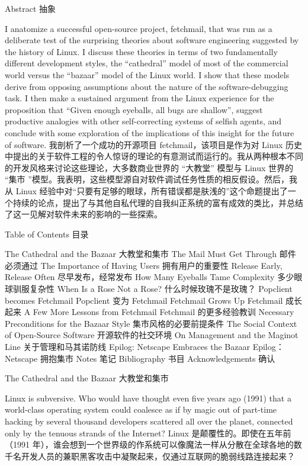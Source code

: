 \documentclass[a4paper,12pt,UTF8,twoside]{ctexbook}
\begin{document}
Abstract  抽象

I anatomize a successful open-source project, fetchmail, that was run as a deliberate test of the surprising theories about software engineering suggested by the history of Linux. I discuss these theories in terms of two fundamentally different development styles, the ``cathedral'' model of most of the commercial world versus the ``bazaar'' model of the Linux world. I show that these models derive from opposing assumptions about the nature of the software-debugging task. I then make a sustained argument from the Linux experience for the proposition that ``Given enough eyeballs, all bugs are shallow'', suggest productive analogies with other self-correcting systems of selfish agents, and conclude with some exploration of the implications of this insight for the future of software.
我剖析了一个成功的开源项目 fetchmail，该项目是作为对 Linux 历史中提出的关于软件工程的令人惊讶的理论的有意测试而运行的。我从两种根本不同的开发风格来讨论这些理论，大多数商业世界的 “大教堂” 模型与 Linux 世界的 “集市 ”模型。我表明，这些模型源自对软件调试任务性质的相反假设。然后，我从 Linux 经验中对“只要有足够的眼球，所有错误都是肤浅的”这个命题提出了一个持续的论点，提出了与其他自私代理的自我纠正系统的富有成效的类比，并总结了这一见解对软件未来的影响的一些探索。

Table of Contents  目录

The Cathedral and the Bazaar
大教堂和集市
The Mail Must Get Through
邮件必须通过
The Importance of Having Users
拥有用户的重要性
Release Early, Release Often
尽早发布，经常发布
How Many Eyeballs Tame Complexity
多少眼球驯服复杂性
When Is a Rose Not a Rose?
什么时候玫瑰不是玫瑰？
Popclient becomes Fetchmail
Popclient 变为 Fetchmail
Fetchmail Grows Up  Fetchmail 成长起来
A Few More Lessons from Fetchmail
Fetchmail 的更多经验教训
Necessary Preconditions for the Bazaar Style
集市风格的必要前提条件
The Social Context of Open-Source Software
开源软件的社交环境
On Management and the Maginot Line
关于管理和马其诺防线
Epilog: Netscape Embraces the Bazaar
Epilog：Netscape 拥抱集市
Notes  笔记
Bibliography  书目
Acknowledgements  确认

The Cathedral and the Bazaar
大教堂和集市

Linux is subversive. Who would have thought even five years ago (1991) that a world-class operating system could coalesce as if by magic out of part-time hacking by several thousand developers scattered all over the planet, connected only by the tenuous strands of the Internet?
Linux 是颠覆性的。即使在五年前（1991 年），谁会想到一个世界级的作系统可以像魔法一样从分散在全球各地的数千名开发人员的兼职黑客攻击中凝聚起来，仅通过互联网的脆弱线路连接起来？
\end{document}
